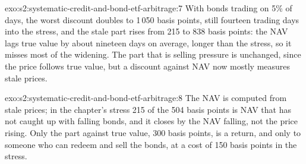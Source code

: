 \begin{solution}{exo:s2:systematic-credit-and-bond-etf-arbitrage:7}
With bonds trading on 5\% of days, the worst discount doubles to 1\,050 basis points, still fourteen trading days into the stress, and the stale part
rises from 215 to 838 basis points: the NAV lags true value by about nineteen days on average, longer than the stress, so it misses most of the
widening. The part that is selling pressure is unchanged, since the price follows true value, but a discount against NAV now mostly measures stale
prices.
\end{solution}

\begin{solution}{exo:s2:systematic-credit-and-bond-etf-arbitrage:8}
The NAV is computed from stale prices; in the chapter's stress 215 of the 504 basis points is NAV that has not caught up with falling bonds, and it
closes by the NAV falling, not the price rising. Only the part against true value, 300 basis points, is a return, and only to someone who can redeem
and sell the bonds, at a cost of 150 basis points in the stress.
\end{solution}

